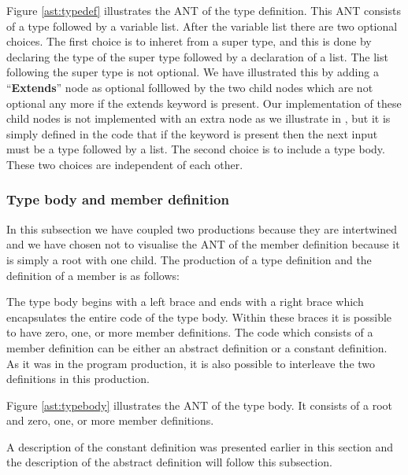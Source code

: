 Figure \ref{ast:typedef} illustrates the ANT of the type
definition. This ANT consists of a type followed by a variable
list. After the variable list there are two optional choices. The first choice
is to inheret from a super type, and this is done by declaring the type of the super
type followed by a declaration of a list. The list following the super type is
not optional. We have illustrated this by adding a ``\textbf{Extends}'' node as
optional folllowed by the two child nodes which are not optional any more if the
extends keyword is present. Our implementation of these child nodes is not
implemented with an extra node as we illustrate in , but it 
is simply defined in the code that if the
keyword is present then the next input must be a type followed by a list.
The second choice is to include a type body. These two choices are independent
of each other.

\subsubsection{Type body and member definition}

In this subsection we have coupled two productions because they are intertwined
and we have chosen not to visualise the ANT of the member definition because it
is simply a root with one child. The production of a type definition and the
definition of a member is as follows:

\begin{ebnf}
\end{ebnf}

The type body begins with a left brace and ends with a right brace which
encapsulates the entire code of the type body. Within these braces it is
possible to have zero, one, or more member definitions. The code which consists
of a member definition can be either an abstract definition or a constant
definition. As it was in the program production, it is also possible to
interleave the two definitions in this production.



Figure \ref{ast:typebody} illustrates the ANT of the type body. It consists of a
root and zero, one, or more member definitions.

A description of the constant definition was presented earlier in this section
and the description of the abstract definition will follow this subsection.

